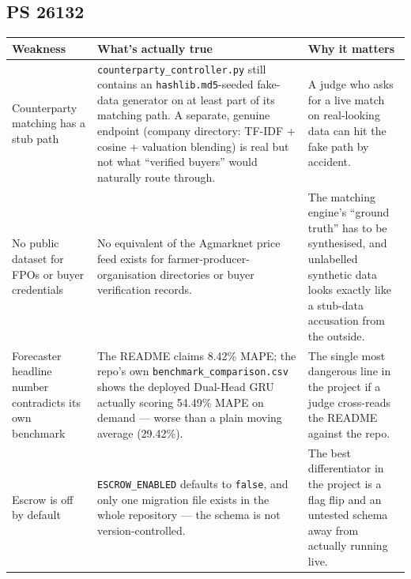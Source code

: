 \documentclass[11pt]{article}
\begin{document}
\subsection*{PS 26132}
\renewcommand{\arraystretch}{1.3}
\begin{longtable}{@{}p{4.1cm}p{7.6cm}p{3.6cm}@{}}
\toprule
\textbf{Weakness} & \textbf{What's actually true} & \textbf{Why it matters} \\
\midrule
\endhead
Counterparty matching has a stub path & \texttt{counterparty\_controller.py} still contains an
\texttt{hashlib.md5}-seeded fake-data generator on at least part of its matching path. A separate, genuine
endpoint (company directory: TF-IDF + cosine + valuation blending) is real but not what ``verified buyers''
would naturally route through. & A judge who asks for a live match on real-looking data can hit the fake
path by accident. \\[0.4em]
No public dataset for FPOs or buyer credentials & No equivalent of the Agmarknet price feed exists for
farmer-producer-organisation directories or buyer verification records. & The matching engine's ``ground
truth'' has to be synthesised, and unlabelled synthetic data looks exactly like a stub-data accusation from
the outside. \\[0.4em]
Forecaster headline number contradicts its own benchmark & The README claims 8.42\% MAPE; the repo's own
\texttt{benchmark\_comparison.csv} shows the deployed Dual-Head GRU actually scoring 54.49\% MAPE on demand
--- worse than a plain moving average (29.42\%). & The single most dangerous line in the project if a judge
cross-reads the README against the repo. \\[0.4em]
Escrow is off by default & \texttt{ESCROW\_ENABLED} defaults to \texttt{false}, and only one migration file
exists in the whole repository --- the schema is not version-controlled. & The best differentiator in the
project is a flag flip and an untested schema away from actually running live. \\
\bottomrule
\end{longtable}
\end{document}
